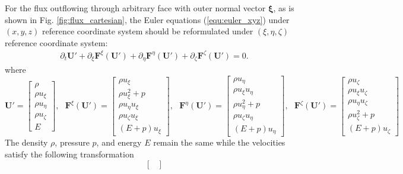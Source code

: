 \documentclass{report}
\begin{document}
\begin{appendices}
For the flux outflowing through arbitrary face with outer normal vector $\bm{\xi}$, as is shown in Fig. \ref{fig:flux_cartesian}, the Euler equations (\ref{equ:euler_xyz}) under $(x,y,z)$ reference coordinate system should be reformulated under $(\xi, \eta, \zeta)$ reference coordinate system:
\begin{align} \label{equ:euler_xez}
    \partial_t \mathbf{U'} + \partial_\xi \mathbf{F}^\xi(\mathbf{U'}) + \partial_\eta \mathbf{F}^\eta(\mathbf{U'}) + \partial_\zeta \mathbf{F}^\zeta(\mathbf{U'}) = 0.
\end{align}
where
\begin{equation*}
    \mathbf{U'} =
    \begin{bmatrix}
    \rho \\
    \rho u_\xi \\
    \rho u_\eta \\
    \rho u_\zeta \\
    E
    \end{bmatrix}, \ \ \ 
    \mathbf{F}^\xi(\mathbf{U'}) =
    \begin{bmatrix}
    \rho u_\xi \\
    \rho u_\xi^2 + p \\
    \rho u_\eta u_\xi  \\
    \rho u_\zeta u_\xi \\
    (E + p)u_\xi
    \end{bmatrix}, \ \ \ 
    \mathbf{F}^\eta(\mathbf{U'}) =
    \begin{bmatrix}
    \rho u_\eta \\
    \rho u_\xi u_\eta \\
    \rho u_\eta^2 + p \\
    \rho u_\zeta u_\eta \\
    (E + p)u_\eta
    \end{bmatrix}, \ \ \ 
    \mathbf{F}^\zeta(\mathbf{U'}) =
    \begin{bmatrix}
    \rho u_\zeta \\
    \rho u_\xi u_\zeta  \\
    \rho u_\eta u_\zeta  \\
    \rho u_\zeta^2  + p\\
    (E + p)u_\zeta
    \end{bmatrix}
\end{equation*}
The density $\rho$, pressure $p$, and energy $E$ remain the same while the velocities satisfy the following transformation
\begin{equation} \label{equ:rotation_relation}
    \begin{bmatrix}

\end{bmatrix}
\end{equation}
\end{appendices}
\end{document}
